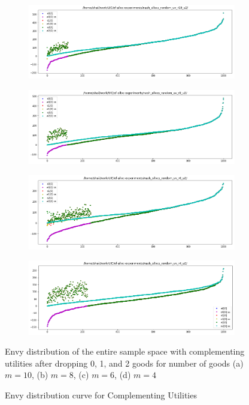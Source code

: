 \begin{figure}[h!]
  \centering
  \begin{subfigure}[b]{0.47\linewidth}
    \includegraphics[width=\linewidth]{images/compl/pdf_complementing_10.png}
    \caption{}
  \end{subfigure}
  \begin{subfigure}[b]{0.47\linewidth}
    \includegraphics[width=\linewidth]{images/compl/pdf_complementing_8.png}
    \caption{}
  \end{subfigure}
  \begin{subfigure}[b]{0.47\linewidth}
    \includegraphics[width=\linewidth]{images/compl/pdf_complementing_6.png}
    \caption{}
  \end{subfigure}
  \begin{subfigure}[b]{0.47\linewidth}
    \includegraphics[width=\linewidth]{images/compl/pdf_complementing_4.png}
    \caption{}
  \end{subfigure}
  \caption{Envy distribution curve for Complementing Utilities}
  \label{fig_efk_dist_curve_compl}
  \small
    Envy distribution of the entire sample space with complementing utilities after dropping 0, 1, and 2 goods for number of goods (a) $m = 10$, (b) $m = 8$, (c) $m = 6$, (d) $m = 4$
\end{figure}

